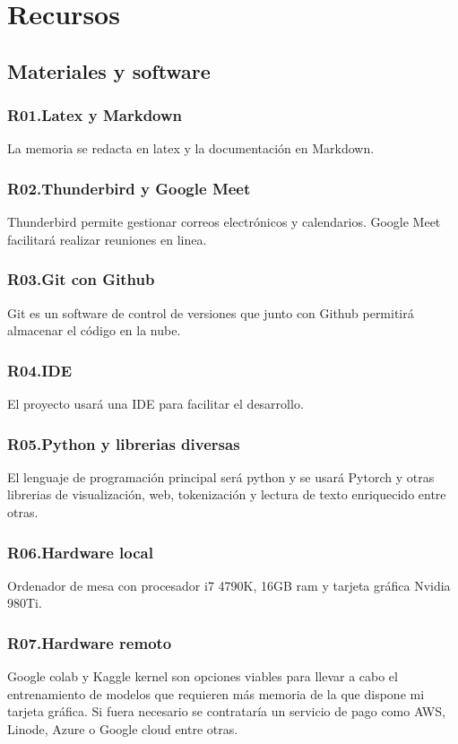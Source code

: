 \section{Recursos}
\subsection{Materiales y software}
\subsubsection{R01.\quad Latex y Markdown}\label{R01} La memoria se redacta en latex y la documentación en Markdown.
\subsubsection{R02.\quad Thunderbird y Google Meet}\label{R02} Thunderbird permite gestionar
correos electrónicos y calendarios. Google Meet facilitará realizar reuniones en linea.
\subsubsection{R03.\quad Git con Github}\label{R03} Git es un software de control de versiones que junto con Github
permitirá almacenar el código en la nube.
\subsubsection{R04.\quad IDE}\label{R04} El proyecto usará una IDE para facilitar el desarrollo.
\subsubsection{R05.\quad Python y librerias diversas}\label{R05} El lenguaje de programación principal será python y 
se usará Pytorch y otras librerias de visualización, web, tokenización y lectura de texto enriquecido entre otras.
\subsubsection{R06.\quad Hardware local}\label{R06} Ordenador de mesa con procesador i7 4790K, 16GB ram y tarjeta gráfica
Nvidia 980Ti.
\subsubsection{R07.\quad Hardware remoto}\label{R07} Google colab y Kaggle kernel son opciones viables para llevar a cabo el entrenamiento
de modelos que requieren más memoria de la que dispone mi tarjeta gráfica.
Si fuera necesario se contrataría un servicio de pago como AWS, Linode, Azure o Google
cloud entre otras.

